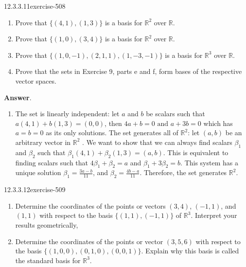 \documentclass[twoside,10pt,]{book}
\numberwithin{equation}{section}
\begin{document}
\begin{divisionsolution}{12.3.3.11}{}{exercise-508}%
\hypertarget{p-4551}{}%
\leavevmode%
\begin{enumerate}[label=(\alph*)]
\item\hypertarget{li-2087}{}\hypertarget{p-4552}{}%
Prove that \(\{(4, 1), (1, 3)\}\) is a basis for \(\mathbb{R}^2\) over \(\mathbb{R}\).%
\item\hypertarget{li-2088}{}\hypertarget{p-4553}{}%
Prove that \(\{(1, 0), (3, 4)\}\) is a basis for \(\mathbb{R}^2\) over \(\mathbb{R}\).%
\item\hypertarget{li-2089}{}\hypertarget{p-4554}{}%
Prove that \(\{(1,0, -1), (2, 1, 1), (1, -3, -1)\}\) is a basis for \(\mathbb{R}^3\) over \(\mathbb{R}\).%
\item\hypertarget{li-2090}{}\hypertarget{p-4555}{}%
Prove that the sets in Exercise 9, parts e and f, form bases of the respective vector spaces.%
\end{enumerate}
%
\par\smallskip%
\noindent\textbf{Answer}.\quad%
\hypertarget{p-4556}{}%
\leavevmode%
\begin{enumerate}[label=(\alph*)]
\item\hypertarget{li-2091}{}\hypertarget{p-4557}{}%
The set is linearly independent: let \(a\) and \(b\) be scalars such that \(a(4, 1) + b(1, 3) = (0, 0)\), then \(4a + b = 0\textrm{   and  } a + 3b= 0\) which has \(a = b = 0\) as its only solutions. The set generates all of \(\mathbb{R}^2\): let \((a, b)\) be an arbitrary vector in \(\mathbb{R}^2\) . We want to show that we can always find scalars \(\beta _1\) and \(\beta _2\) such that \(\beta _1(4, 1) +\beta _2 (1,3) = (a, b)\). This is equivalent to finding scalars such that \(4\beta _1 +\beta _2 = a\) and \(\beta _1 + 3\beta _2 = b\). This system has a unique solution  \(\beta _1=\frac{3a - b}{11}\), and \(\beta _2= \frac{4b-a}{11}\). Therefore, the set generates \(\mathbb{R}^2\).%
\end{enumerate}
%
\end{divisionsolution}%
\begin{divisionsolution}{12.3.3.12}{}{exercise-509}%
\hypertarget{p-4558}{}%
\leavevmode%
\begin{enumerate}[label=(\alph*)]
\item\hypertarget{li-2092}{}\hypertarget{p-4559}{}%
Determine the coordinates of the points or vectors \((3, 4)\), \((-1, 1)\), and \((1, 1)\) with respect to the basis \(\{(1, 1),(-1, 1)\}\) of \(\mathbb{R}^3\). Interpret your results geometrically,%
\item\hypertarget{li-2093}{}\hypertarget{p-4560}{}%
Determine the coordinates of the points or vector \((3, 5, 6)\) with respect to the basis \(\{(1, 0, 0), (0, 1, 0), (0, 0, 1)\}\). Explain why this basis is called the standard basis for \(\mathbb{R}^3\).%
\end{enumerate}
%
\end{divisionsolution}%
\end{document}
